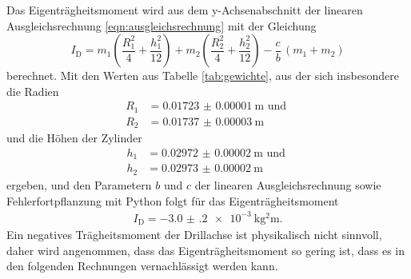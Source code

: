 Das Eigenträgheitsmoment wird aus dem y-Achsenabschnitt der linearen
Ausgleichsrechnung \eqref{eqn:ausgleichsrechnung} mit der Gleichung
\begin{equation}
  I_\text{D} = m_1\left(\frac{R_1^2}{4} + \frac{h_1^2}{12}\right) + m_2 \left(
  \frac{R_2^2}{4}+\frac{h_2^2}{12}\right) - \frac{c}{b}\, (m_1 + m_2)
  \label{eqn:eigentraegheitsmoment}
\end{equation}
berechnet. Mit den Werten aus Tabelle \ref{tab:gewichte}, aus der sich insbesondere
die Radien
\begin{align*}
  R_1 &= \SI{0.01723(1)}{\meter} \text{ und }\\
  R_2 &= \SI{0.01737(3)}{\meter}
\end{align*}
und die Höhen der Zylinder
\begin{align*}
  h_1 &= \SI{0.02972(2)}{\meter} \text{ und } \\
  h_2 &= \SI{0.02973(2)}{\meter}
\end{align*}
ergeben, und den Parametern $b$ und $c$ der linearen Ausgleichsrechnung sowie
Fehlerfortpflanzung mit Python folgt für das Eigenträgheitsmoment
\begin{align*}
  I_\text{D} = \SI{-3.0(2)e-3}{\kilo\gram\squared\meter}.
\end{align*}
Ein negatives Trägheitsmoment der Drillachse ist physikalisch nicht sinnvoll,
daher wird angenommen, dass das Eigenträgheitsmoment so gering ist, dass es
in den folgenden Rechnungen vernachlässigt werden kann.

